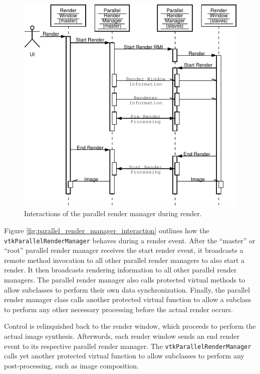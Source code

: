 \documentclass[twocolumn]{article}
\newcommand{\cidentifier}[1]{\texttt{#1}}
\begin{document}
  \begin{figure}
    \begin{center}
      \includegraphics[width=\linewidth]
		      {images/ParallelRenderManagerInteraction}
    \end{center}
    \caption{Interactions of the parallel render manager during render.}
    \label{fig:parallel_render_manager_interaction}
  \end{figure}
  Figure \vref{fig:parallel_render_manager_interaction} outlines how the
  \cidentifier{vtk\-Parallel\-Render\-Manager} behaves during a render
  event.  After the ``master'' or ``root'' parallel render manager receives
  the start render event, it broadcasts a remote method invocation to all
  other parallel render managers to also start a render.  It then
  broadcasts rendering information to all other parallel render managers.
  The parallel render manager also calls protected virtual methods to allow
  subclasses to perform their own data synchronization.  Finally, the
  parallel render manager class calls another protected virtual function to
  allow a subclass to perform any other necessary processing before the
  actual render occurs.

  Control is relinquished back to the render window, which proceeds to
  perform the actual image synthesis.  Afterwords, each render window sends
  an end render event to its respective parallel render manager.  The
  \cidentifier{vtk\-Parallel\-Render\-Manager} calls yet another protected
  virtual function to allow subclasses to perform any post-processing, such
  as image composition.
\end{document}
